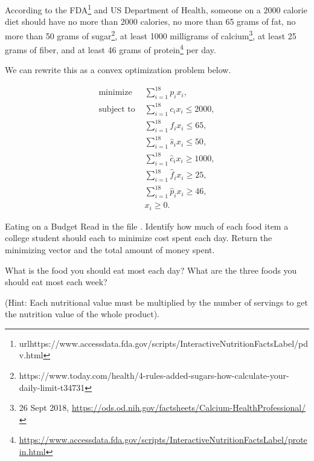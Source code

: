  According to the FDA\footnote[1]{url{https://www.accessdata.fda.gov/scripts/InteractiveNutritionFactsLabel/pdv.html}} and US Department of Health, someone on a $2000$ calorie diet should have no more than 2000 calories, no more than 65 grams of fat, no more than 50 grams of sugar\footnote[2]{https://www.today.com/health/4-rules-added-sugars-how-calculate-your-daily-limit-t34731}, at least 1000 milligrams of calcium\footnote[1]{26 Sept 2018, \url{https://ods.od.nih.gov/factsheets/Calcium-HealthProfessional/}}, at least 25 grams of fiber, and at least 46 grams of protein\footnote[2]{\url{https://www.accessdata.fda.gov/scripts/InteractiveNutritionFactsLabel/protein.html}} per day.

 We can rewrite this as a convex optimization problem below.

 \begin{align*}
\text{minimize } & \sum_{i=1}^{18}p_ix_i, \\
\text{subject to }& \sum_{i=1}^{18} c_ix_i \leq 2000, \\
			& \sum_{i=1}^{18} f_ix_i \leq 65, \\
			& \sum_{i=1}^{18} \hat{s}_ix_i \leq 50, \\
			& \sum_{i=1}^{18} \hat{c}_ix_i \geq 1000, \\
			& \sum_{i=1}^{18} \hat{f}_ix_i \geq 25, \\
			& \sum_{i=1}^{18} \hat{p}_ix_i \geq 46, \\
			& x_i \geq 0.
\end{align*}

 \begin{problem}{Eating on a Budget}{}
Read in the file .
Identify how much of each food item a college student should each to minimize cost spent each day.
Return the minimizing vector and the total amount of money spent.

What is the food you should eat most each day? 
What are the three foods you should eat most each week?

(Hint: Each nutritional value must be multiplied by the number of servings to get the nutrition value of the whole product).
\label{prob:diet}
\end{problem}

